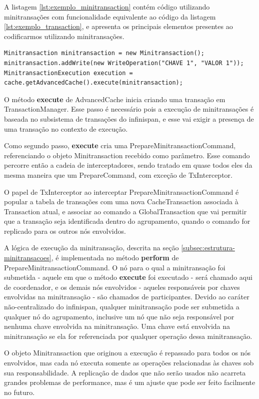 \documentclass[11pt,twoside,a4paper]{book}
\begin{document}
A listagem \ref{lst:exemplo_minitransaction} contém código utilizando minitransações com funcionalidade equivalente ao código da listagem \ref{lst:exemplo_transaction}, e apresenta os principais elementos presentes ao codificarmos utilizando minitransações.

\begin{lstlisting}[caption={Minitransação}, label=lst:exemplo_minitransaction]
Minitransaction minitransaction = new Minitransaction();
minitransaction.addWrite(new WriteOperation("CHAVE 1", "VALOR 1"));
MinitransactionExecution execution = cache.getAdvancedCache().execute(minitransaction);
\end{lstlisting}

O método \textbf{execute} de AdvancedCache inicia criando uma transação em TransactionManager. Esse passo é necessário pois a execução de minitransações é baseada no subsistema de transações do infinispan, e esse vai exigir a presença de uma transação no contexto de execução.

Como segundo passo, \textbf{execute} cria uma PrepareMinitransactionCommand, referenciando o objeto Minitransaction recebido como parâmetro. Esse comando percorre então a cadeia de interceptadores, sendo tratado em quase todos eles da mesma maneira que um PrepareCommand, com exceção de TxInterceptor.

O papel de TxInterceptor ao interceptar PrepareMinitransactionCommand é popular a tabela de transações com uma nova CacheTransaction associada à Transaction atual, e associar ao comando a GlobalTransaction que vai permitir que a transação seja identificada dentro do agrupamento, quando o comando for replicado para os outros nós envolvidos.

A lógica de execução da minitransação, descrita na seção \ref{subsec:estrutura-minitransacoes}, é implementada no método \textbf{perform} de PrepareMinitransactionCommand. O nó para o qual a minitransação foi submetida - aquele em que o método \textbf{execute} foi executado - será chamado aqui de coordenador, e os demais nós envolvidos - aqueles responsáveis por chaves envolvidas na minitransação - são chamados de participantes. Devido ao caráter não-centralizado do infinispan, qualquer minitransação pode ser submetida a qualquer nó do agrupamento, inclusive um nó que não seja responsável por nenhuma chave envolvida na minitransação. Uma chave está envolvida na minitransação se ela for referenciada por qualquer operação dessa minitransação.

O objeto Minitransaction que originou a execução é repassado para todos os nós envolvidos, mas cada nó executa somente as operações relacionadas às chaves sob sua responsabilidade. A replicação de dados que não serão usados não acarreta grandes problemas de performance, mas é um ajuste que pode ser feito facilmente no futuro.
\end{document}
